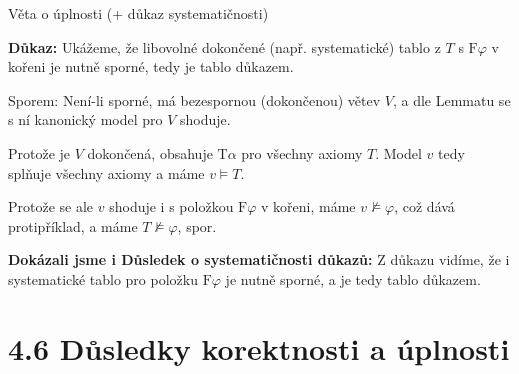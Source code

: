 \documentclass{beamer}
\begin{document}
\begin{frame}{Věta o úplnosti (+ důkaz systematičnosti)}

    
    \pause
    \textbf{Důkaz:}
    Ukážeme, že libovolné dokončené (např. \alert{systematické}) tablo z $T$ s $\mathrm{F}\varphi$ v kořeni je nutně sporné, tedy je tablo důkazem. 
    
    \pause
    Sporem: \alert{Není-li sporné}, má bezespornou (dokončenou) větev $V$, a dle Lemmatu se s ní kanonický model pro $V$ shoduje. 
    
    \pause
    Protože je $V$ dokončená, obsahuje $\mathrm{T}\alpha$ pro všechny axiomy $T$. Model $v$ tedy splňuje všechny axiomy a máme $v\models T$. 
    
    \pause
    Protože se ale $v$ shoduje i s položkou $\mathrm{F}\varphi$ v kořeni, máme $v\not\models\varphi$, což dává protipříklad, a máme $T\not\models\varphi$, spor.\hfill\qedsymbol

    \pause
    \textbf{Dokázali jsme i Důsledek o systematičnosti důkazů:}  Z důkazu vidíme, že i systematické tablo pro položku $\mathrm{F}\varphi$ je nutně sporné, a je tedy tablo důkazem.\hfill\qedsymbol

\end{frame}


\section{4.6 Důsledky korektnosti a úplnosti}
\end{document}
